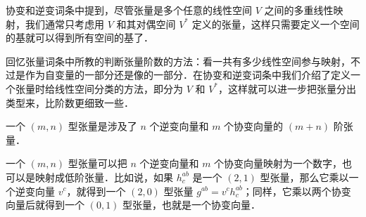 
\begin{issues}
\issueDraft
\end{issues}


协变和逆变词条中提到，尽管张量是多个任意的线性空间 $V$ 之间的多重线性映射，我们通常只考虑用 $V$ 和其对偶空间 $V^*$ 定义的张量，这样只需要定义一个空间的基就可以得到所有空间的基了．

回忆张量词条中所教的判断张量阶数的方法：看一共有多少线性空间参与映射，不过是作为自变量的一部分还是像的一部分．在协变和逆变词条中我们介绍了定义一个张量时给线性空间分类的方法，即分为 $V$ 和 $V^*$，这样就可以进一步把张量分出类型来，比阶数更细致一些．

\begin{definition}{}
一个 $(m, n)$ 型张量是涉及了 $n$ 个逆变向量和 $m$ 个协变向量的 $(m+n)$ 阶张量．
\end{definition}

一个 $(m, n)$ 型张量可以把 $n$ 个逆变向量和 $m$ 个协变向量映射为一个数字，也可以是映射成低阶张量．比如说，如果 $h^{ab}_c$ 是一个 $(2, 1)$ 型张量，那么它乘以一个逆变向量 $v^c$，就得到一个 $(2, 0)$ 型张量 $g^{ab}=v^ch^{ab}_c$；同样，它乘以两个协变向量后就得到一个 $(0, 1)$ 型张量，也就是一个协变向量．









